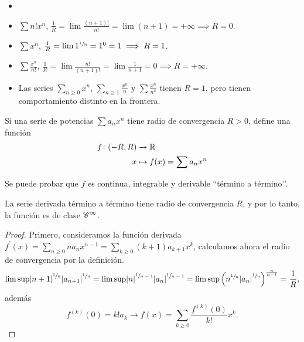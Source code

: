 \begin{example}
    \begin{itemize}
        \item[]
        \item $\sum n!x^n$, $\frac{1}{R} = \lim \frac{(n+1)!}{n!} = \lim (n+1)
            = +\infty \implies R = 0$.
        \item $\sum x^n$, $\frac{1}{R} = \lim 1^{\sfrac{1}{n}} = 1^0 = 1 \implies
            R = 1$.
        \item $\sum \frac{x^n}{n!}$, $\frac{1}{R} = \lim \frac{n!}{(n+1)!} =
            \lim \frac{1}{n+1} = 0 \implies R = +\infty$.
        \item Las series $\sum\limits_{n \geq 0} x^n$, $\sum\limits_{n \geq 1} \frac{x^n}{n}$
            y $\sum \frac{x^n}{n^2}$ tienen $R = 1$, pero tienen comportamiento
            distinto en la frontera.
    \end{itemize}
\end{example}

\begin{defi*}
    Si una serie de potencias $\sum a_n x^n$ tiene radio de convergencia $R > 0$,
    define una función
    \[\begin{aligned}
        f \colon (-R,R) &\to \mathbb{R} \\ x &\mapsto f(x) = \sum a_n x^n
    \end{aligned}\]
\end{defi*}

\begin{obs}
    Se puede probar que $f$ es continua, integrable y derivable
    ``término a término’’.
\end{obs}

\begin{obs}
    La serie derivada término a término tiene radio de convergencia $R$, y por
    lo tanto, la función es de clase $\mathscr{C}^\infty$.
\end{obs}

\begin{proof}
    Primero, consideramos la función derivada $f^\prime (x) = \sum\limits_{n \geq 0}
    n a_n x^{n-1} = \sum\limits_{k \geq 0} (k+1) a_{k+1} x^k$, calculamos ahora
    el radio de convergencia por la definición.
    \[
        \limsup \abs{n+1}^{\sfrac{1}{n}}\abs{a_{n+1}}^{\sfrac{1}{n}} =
        \limsup \abs{n}^{\sfrac{1}{n-1}}\abs{a_{n}}^{\sfrac{1}{n-1}} =
        \limsup \left( n^{\sfrac{1}{n}} \abs{a_n}^{\sfrac{1}{n}} \right)^
        {\frac{n}{n-1}} = \frac{1}{R},
    \]
    además
    \[
        f^{(k)}(0) = k! a_k \rightarrow f(x) = \sum_{k \geq 0} \frac{f^{(k)}(0)}
        {k!}x^k.
    \]
\end{proof}

